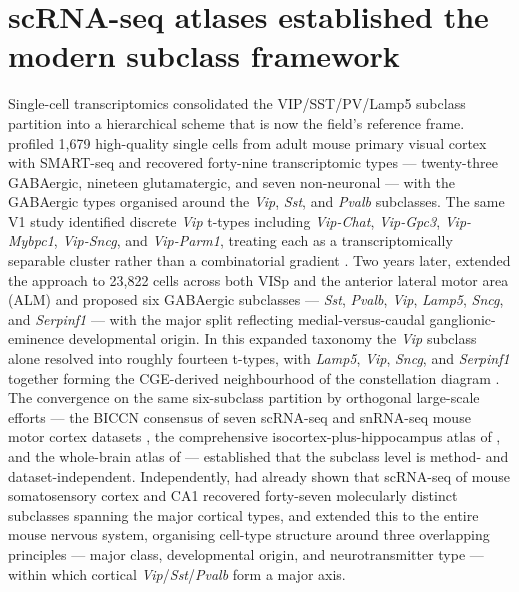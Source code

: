 \documentclass[11pt]{article}
\begin{document}
\section{scRNA-seq atlases established the modern subclass framework}

Single-cell transcriptomics consolidated the VIP/SST/PV/Lamp5 subclass partition into a hierarchical scheme that is now the field's reference frame. \citet{Tasic2016} profiled 1,679 high-quality single cells from adult mouse primary visual cortex with SMART-seq and recovered forty-nine transcriptomic types --- twenty-three GABAergic, nineteen glutamatergic, and seven non-neuronal --- with the GABAergic types organised around the \textit{Vip}, \textit{Sst}, and \textit{Pvalb} subclasses. The same V1 study identified discrete \textit{Vip} t-types including \textit{Vip-Chat}, \textit{Vip-Gpc3}, \textit{Vip-Mybpc1}, \textit{Vip-Sncg}, and \textit{Vip-Parm1}, treating each as a transcriptomically separable cluster rather than a combinatorial gradient \citep{Tasic2016}. Two years later, \citet{Tasic2018} extended the approach to 23,822 cells across both VISp and the anterior lateral motor area (ALM) and proposed six GABAergic subclasses --- \textit{Sst}, \textit{Pvalb}, \textit{Vip}, \textit{Lamp5}, \textit{Sncg}, and \textit{Serpinf1} --- with the major split reflecting medial-versus-caudal ganglionic-eminence developmental origin. In this expanded taxonomy the \textit{Vip} subclass alone resolved into roughly fourteen t-types, with \textit{Lamp5}, \textit{Vip}, \textit{Sncg}, and \textit{Serpinf1} together forming the CGE-derived neighbourhood of the constellation diagram \citep{Tasic2018}. The convergence on the same six-subclass partition by orthogonal large-scale efforts --- the BICCN consensus of seven scRNA-seq and snRNA-seq mouse motor cortex datasets \citep{Yao2021b}, the comprehensive isocortex-plus-hippocampus atlas of \citet{Yao2021a}, and the whole-brain atlas of \citet{Yao2023} --- established that the subclass level is method- and dataset-independent. Independently, \citet{Zeisel2015} had already shown that scRNA-seq of mouse somatosensory cortex and CA1 recovered forty-seven molecularly distinct subclasses spanning the major cortical types, and \citet{Zeisel2018} extended this to the entire mouse nervous system, organising cell-type structure around three overlapping principles --- major class, developmental origin, and neurotransmitter type --- within which cortical \textit{Vip}/\textit{Sst}/\textit{Pvalb} form a major axis.
\end{document}
